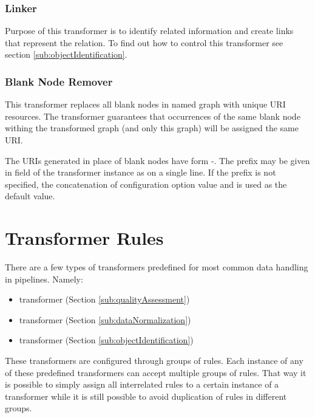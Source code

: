 \subsubsection{Linker}
Purpose of this transformer is to identify related information and create links that represent the relation. To find out how to control this transformer see section \ref{sub:objectIdentification}.

\subsubsection{Blank Node Remover}
This transformer replaces all blank nodes in  named graph with unique URI resources. The transformer guarantees that occurrences of the same blank node withing the transformed graph (and only this graph) will be assigned the same URI.

The URIs generated in place of blank nodes have form -. The prefix may be given in  field of the transformer instance as  on a single line. If the prefix is not specified, the concatenation of  configuration option value and  is used as the default value.

\section{Transformer Rules}
\label{sec:transformerRules}

	There are a few types of {transformers} predefined for most common data handling in pipelines. Namely:
	\begin{itemize}
		\item {} {transformer} (Section \ref{sub:qualityAssessment})
		\item {} {transformer}  (Section \ref{sub:dataNormalization})
		\item {} {transformer} (Section \ref{sub:objectIdentification})
	\end{itemize}
	
	These {transformers} are configured through groups of rules. Each instance of any of these predefined {transformers} can accept multiple groups of rules. That way it is possible to simply assign all interrelated rules to a certain instance of a transformer while it is still possible to avoid duplication of rules in different groups.

